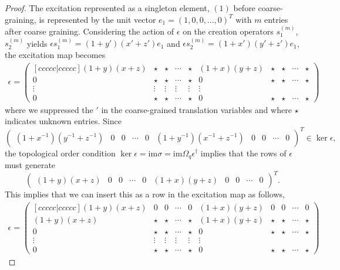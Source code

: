\documentclass[prx,twocolumn,superscriptaddress,nofootinbib,showpacs,notitlepage]{revtex4-2}
\newcommand{\im}{{\mathrm{im}}}
\begin{document}
\begin{proof}

The excitation represented as a singleton element, $(1)$ before coarse-graining, is represented by the unit vector $e_1=(1,0,0,...,0)^T$ with $m$ entries after coarse graining. Considering the action of $\epsilon$ on the creation operators $s_1^{(m)}$, $s_2^{(m)}$ yields $\epsilon s_1^{(m)}=(1+y')(x'+z')e_1$ and $\epsilon s_2^{(m)}=(1+x')(y'+z')e_1$, the excitation map becomes
\begin{align}
\epsilon = \begin{pmatrix}[ccccc|ccccc]
(1+y)(x+z) & \star & \star & \cdots & \star & (1+x)(y+z) &  \star & \star & \cdots & \star \\
0     &\star & \star & \cdots & \star  & 0   &  \star & \star & \cdots & \star \\
\vdots&\vdots& \vdots & \vdots & \vdots & \vdots \\
0    & \star & \star & \cdots & \star  & 0   &  \star & \star & \cdots & \star
\end{pmatrix} \label{eq:eps1}
\end{align}
where we suppressed the $\prime$ in the coarse-grained translation variables and where $\star$ indicates unknown entries.
Since $$\begin{pmatrix}
(1+x^{-1})(y^{-1}+z^{-1}) &0& 0 & \cdots & 0&(1+y^{-1})(x^{-1}+z^{-1}) &0& 0 & \cdots & 0
\end{pmatrix}^T\in \ker \epsilon,$$ the topological order condition $\ker \epsilon = \im \sigma=\im \Omega_q \epsilon^\dagger$ implies that
the rows of $\epsilon$ must generate
$$\begin{pmatrix}
(1+y)(x+z) &0& 0 & \cdots & 0&(1+x)(y+z) &0& 0 & \cdots & 0
\end{pmatrix}^T.$$
This implies that we can insert this as a row in the excitation map as follows, 
\begin{align}
\epsilon = \begin{pmatrix}[ccccc|ccccc]
(1+y)(x+z) & 0 & 0 & \cdots & 0 & (1+x)(y+z) &  0 & 0 & \cdots & 0 \\
(1+y)(x+z) & \star & \star & \cdots & \star & (1+x)(y+z) &  \star & \star & \cdots & \star \\
0     &\star & \star & \cdots & \star  & 0   &  \star & \star & \cdots & \star \\
\vdots&\vdots& \vdots & \vdots & \vdots & \vdots \\
0    & \star & \star & \cdots & \star  & 0   &  \star & \star & \cdots & \star 

\end{pmatrix}
\end{align}
\end{proof}
\end{document}
